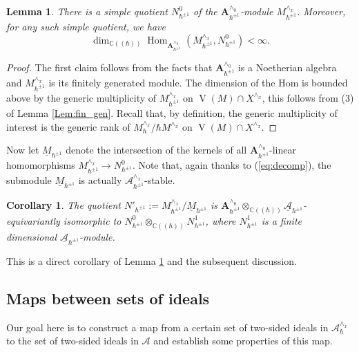 \documentclass[12pt]{amsart}
\newcommand{\A}{\mathcal{A}}
\newcommand{\K}{\mathbb{C}}
\newcommand{\VA}{\operatorname{V}}
\newcommand{\Weyl}{\mathbf{A}}
\newcommand{\Hom}{\operatorname{Hom}}
\newtheorem{Cor}[Thm]{Corollary}
\newtheorem{Lem}[Thm]{Lemma}
\theoremstyle{definition}
\begin{document}
\begin{Lem}\label{Lem:quot_Hom}
There is a simple quotient $N^0_{\hbar^{\pm 1}}$ of the $\Weyl_{\hbar^{\pm 1}}^{\wedge_0}$-module
$M^{\wedge_x}_{\hbar^{\pm 1}}$. Moreover, for any such simple quotient, we have
$$\dim_{\K((\hbar))} \Hom_{\Weyl_{\hbar^{\pm 1}}^{\wedge_0}}(M^{\wedge_x}_{\hbar^{\pm 1}}, N^0_{\hbar^{\pm 1}})<\infty.$$
\end{Lem}
\begin{proof}
The first claim follows from the facts that $\Weyl_{\hbar^{\pm 1}}^{\wedge_0}$ is a Noetherian
algebra and $M^{\wedge_x}_{\hbar^{\pm 1}}$ is its finitely generated module. The dimension
of the Hom is bounded above by the generic multiplicity of $M^{\wedge_x}_{\hbar^{\pm 1}}$
on $\VA(M)\cap X^{\wedge_x}$, this follows from (3) of Lemma \ref{Lem:fin_gen}.
Recall that, by definition, the generic multiplicity of interest is the generic rank of
$M^{\wedge_x}_\hbar/\hbar M^{\wedge_x}$ on $\VA(M)\cap X^{\wedge_x}$.
\end{proof}

Now let $\underline{M}_{\hbar^{\pm 1}}$ denote the intersection of the kernels of all
$\Weyl_{\hbar^{\pm 1}}^{\wedge_0}$-linear homomorphisms $M^{\wedge_x}_{\hbar^{\pm 1}}\rightarrow
N^0_{\hbar^{\pm 1}}$. Note that, again thanks to (\ref{eq:decomp}),
the submodule $\underline{M}_{\hbar^{\pm 1}}$ is actually $\A^{\wedge_x}_{\hbar^{\pm 1}}$-stable.


\begin{Cor}\label{Cor:main}
The quotient $N'_{\hbar^{\pm 1}}:=M^{\wedge_x}_{\hbar^{\pm 1}}/\underline{M}_{\hbar^{\pm 1}}$
is $\Weyl_{\hbar^{\pm 1}}^{\wedge_0}\otimes_{\K((\hbar))}\underline{\A}_{\hbar^{\pm 1}}$-equivariantly
isomorphic to $N^0_{\hbar^{\pm 1}}\otimes_{\K((\hbar))}N^1_{\hbar^{\pm 1}}$, where $N^1_{\hbar^{\pm 1}}$
is a finite dimensional $\underline{\A}_{\hbar^{\pm 1}}$-module.
\end{Cor}

This is a direct corollary of Lemma \ref{Lem:quot_Hom} and the subsequent discussion.

\subsection{Maps between sets of ideals}
Our goal here is to construct a map from a certain set of two-sided ideals in $\A_\hbar^{\wedge_x}$
to the set of two-sided ideals in $\A$ and establish some properties of this map.
\end{document}
